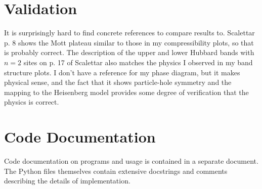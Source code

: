 \documentclass{article}
\begin{document}
\section{Validation}
It is surprisingly hard to find concrete references to compare results to. Scalettar\cite{scalettar} p. 8 shows the Mott plateau similar to those in my compressibility plots, so that is probably correct. The description of the upper and lower Hubbard bands with $n = 2$ sites on p. 17 of Scalettar\cite{scalettar} also matches the physics I observed in my band structure plots. I don't have a reference for my phase diagram, but it makes physical sense, and the fact that it shows particle-hole symmetry and the mapping to the Heisenberg model provides some degree of verification that the physics is correct.

\newpage
\section{Code Documentation}
Code documentation on programs and usage is contained in a separate document. The Python files themselves contain extensive docstrings and comments describing the details of implementation.



\end{document}
